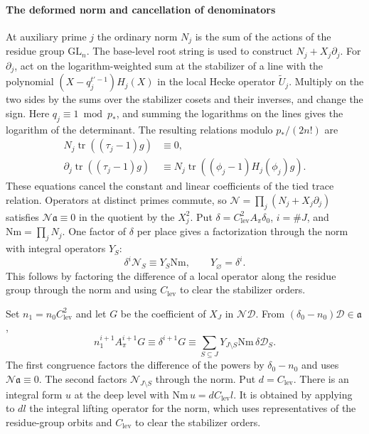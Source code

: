 \paragraph{The deformed norm and cancellation of denominators}
At auxiliary prime \(j\) the ordinary norm \(N_j\) is the sum of
the actions of the residue group \(\mathrm{GL}_{n}\). The base-level
root string is used to construct \(N_j+X_j\partial_j\).
For \(\partial_j\), act on the logarithm-weighted sum at the
stabilizer of a line with the polynomial \((X-q_j^{t'-1})H_j(X)\)
in the local Hecke operator \(\widetilde U_j\). Multiply on the
two sides by the sums over the stabilizer cosets and their inverses,
and change the sign. Here \(q_j\equiv1\bmod p_\ast\), and summing the
logarithms on the lines gives the logarithm of the determinant.
The resulting relations modulo \(p_\ast/(2n!)\) are
\[
 \begin{split}
 N_j\operatorname{tr}((\tau_j-1)g)&\equiv0,\\
 \partial_j\operatorname{tr}((\tau_j-1)g)
    &\equiv N_j\operatorname{tr}((\phi_j-1)H_j(\phi_j)g).
 \end{split}
\]
These equations cancel the constant and linear coefficients of
the tied trace relation. Operators at distinct primes commute,
so \(\mathcal N=\prod_j(N_j+X_j\partial_j)\) satisfies
\(\mathcal N\mathfrak a\equiv0\) in the quotient by the \(X_j^2\).
Put \(\delta=C_{\mathrm{lev}}^2 A_\pi\delta_0\),
\(i=\#J\), and \(\mathrm{Nm}=\prod_jN_j\). One factor of \(\delta\)
per place gives a factorization through the norm with integral
operators \(Y_S\):
\[
 \delta^i\mathcal N_S\equiv Y_S\mathrm{Nm},\qquad
 Y_\varnothing=\delta^i .
\]
This follows by factoring the difference of a local operator along
the residue group through the norm and using \(C_{\mathrm{lev}}\)
to clear the stabilizer orders.

Set \(n_1=n_0 C_{\mathrm{lev}}^2\) and let \(G\) be the coefficient
of \(X_J\) in \(\mathcal N\mathcal D\). From
\((\delta_0-n_0)\mathcal D\in\mathfrak a\),
\[
 n_1^{i+1} A_\pi^{i+1}G
 \equiv \delta^{i+1}G
 \equiv \sum_{S\subseteq J}Y_{J\setminus S}\mathrm{Nm}\,\delta\mathcal D_S .
\]
The first congruence factors the difference of the powers by
\(\delta_0-n_0\) and uses \(\mathcal N\mathfrak a\equiv0\). The
second factors \(\mathcal N_{J\setminus S}\) through the norm.
Put \(d=C_{\mathrm{lev}}\). There is an integral form \(u\) at the
deep level with \(\mathrm{Nm}\,u=d C_{\mathrm{lev}}l\). It is
obtained by applying to \(dl\) the integral lifting operator for
the norm, which uses representatives of the residue-group orbits
and \(C_{\mathrm{lev}}\) to clear the stabilizer orders.

